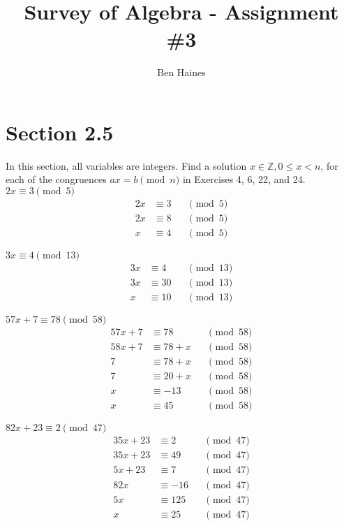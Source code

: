\documentclass[paper=a4, fontsize=11pt]{jhwhw} %
\begin{document}
\title{Survey of Algebra - Assignment \#3}
\author{Ben Haines}

\section*{Section 2.5}
In this section, all variables are integers.
Find a solution $x\in \mathbb Z, 0\le x < n$, for each of the congruences $ax=b \pmod n$ in Exercises 4, 6, 22, and 24.
$2x\equiv 3 \pmod 5$
\solution
\begin{equation}
\begin{alignedat}{2}
2x&\equiv 3 & &\pmod 5\\
2x &\equiv 8 & &\pmod 5\\
x &\equiv 4 & &\pmod 5
\end{alignedat}
\end{equation}


$3x\equiv 4 \pmod {13}$
\solution
\begin{equation}
\begin{alignedat}{2}
3x&\equiv 4 & &\pmod {13}\\
3x &\equiv 30 & &\pmod {13}\\
x &\equiv 10 & &\pmod {13}
\end{alignedat}
\end{equation}

$57x + 7\equiv 78 \pmod {58}$
\solution
\begin{equation}
\begin{alignedat}{2}
57x + 7&\equiv 78 & &\pmod {58}\\
58x + 7&\equiv 78 + x & &\pmod {58}\\
7&\equiv 78 + x & &\pmod {58}\\
7&\equiv 20 + x & &\pmod {58}\\
x&\equiv -13 & &\pmod {58}\\
x&\equiv 45 & &\pmod {58}
\end{alignedat}
\end{equation}

$82x + 23\equiv 2 \pmod {47}$
\solution
\begin{equation}
\begin{alignedat}{2}
35x + 23&\equiv 2 & &\pmod {47}\\
35x + 23&\equiv 49 & &\pmod {47}\\
5x + 23&\equiv 7 & &\pmod {47}\\
82x&\equiv -16 & &\pmod {47}\\
5x&\equiv 125 & &\pmod {47}\\
x&\equiv 25 & &\pmod {47}
\end{alignedat}
\end{equation}\\
\end{document}
